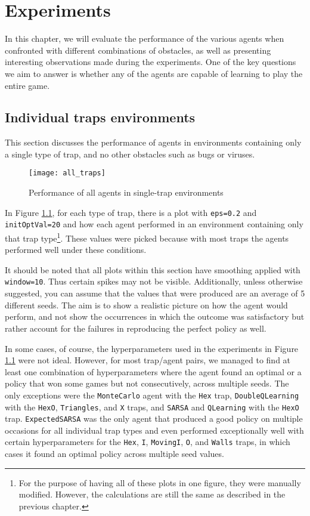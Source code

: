 \chapter{Experiments}
\label{experiments_chapter}
In this chapter, we will evaluate the performance of the various agents when confronted with different combinations of obstacles, as well as presenting interesting observations made during the experiments. One of the key questions we aim to answer is whether any of the agents are capable of learning to play the entire game.

\section{Individual traps environments}
This section discusses the performance of agents in environments containing only a single type of trap, and no other obstacles such as bugs or viruses.

\begin{figure}[h]
    \centering
    \texttt{[image: all\_traps]}
    \caption{Performance of all agents in single-trap environments}
    \label{fig:all_traps}
\end{figure}

In Figure \ref{fig:all_traps}, for each type of trap, there is a plot with \texttt{eps=0.2} and \\	 \texttt{initOptVal=20} and how each agent performed in an environment containing only that trap type\footnote{For the purpose of having all of these plots in one figure, they were manually modified. However, the calculations are still the same as described in the previous chapter.}. These values were picked because with most traps the agents performed well under these conditions.

It should be noted that all plots within this section have smoothing applied with \texttt{window=10}. Thus certain spikes may not be visible. Additionally, unless otherwise suggested, you can assume that the values that were produced are an average of 5 different seeds. The aim is to show a realistic picture on how the agent would perform, and not show the occurrences in which the outcome was satisfactory but rather account for the failures in reproducing the perfect policy as well.

In some cases, of course, the hyperparameters used in the experiments in Figure \ref{fig:all_traps} were not ideal. However, for most trap/agent pairs, we managed to find at least one combination of hyperparameters where the agent found an optimal or a policy that won some games but not consecutively, across multiple seeds. The only exceptions were the \texttt{MonteCarlo} agent with the \texttt{Hex} trap, \texttt{DoubleQLearning} with the \texttt{HexO}, \texttt{Triangles}, and \texttt{X} traps, and \texttt{SARSA} and \texttt{QLearning} with the \texttt{HexO} trap. \texttt{ExpectedSARSA} was the only agent that produced a good policy on multiple occasions for all individual trap types and even performed exceptionally well with certain hyperparameters for the \texttt{Hex}, \texttt{I}, \texttt{MovingI}, \texttt{O}, and \texttt{Walls} traps, in which cases it found an optimal policy across multiple seed values.

